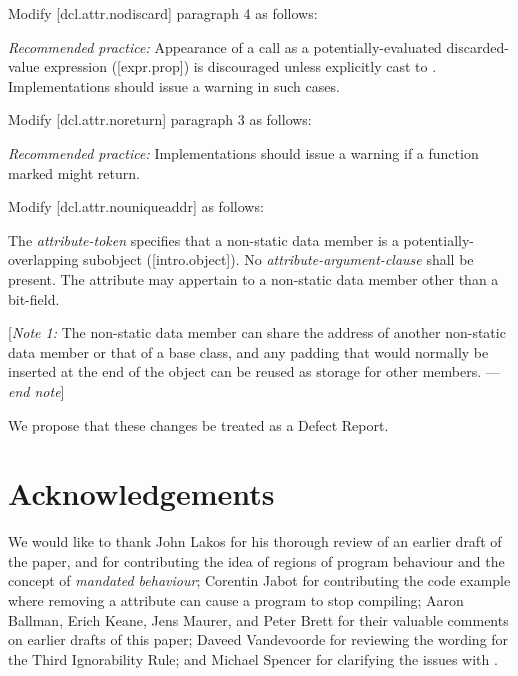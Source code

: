 Modify [dcl.attr.nodiscard] paragraph 4 as follows:

\begin{adjustwidth}{0.5cm}{0.5cm}
\emph{Recommended practice:} Appearance of a  call as a potentially-evaluated discarded-value expression ([expr.prop]) is discouraged unless explicitly cast to . Implementations should issue a warning in such cases. 
\end{adjustwidth}

Modify [dcl.attr.noreturn] paragraph 3 as follows:

\begin{adjustwidth}{0.5cm}{0.5cm}
\emph{Recommended practice:} Implementations should issue a warning if a function marked \tcode{[[noreturn]]} might return. 
\end{adjustwidth}

Modify [dcl.attr.nouniqueaddr] as follows:

\begin{adjustwidth}{0.5cm}{0.5cm}
The \emph{attribute-token}  specifies that a non-static data member is a potentially-overlapping subobject ([intro.object]). No \emph{attribute-argument-clause} shall be present. The attribute may appertain to a non-static data member other than a bit-field.

[\emph{Note 1:} The non-static data member can share the address of another non-static data member or that of a base class, and any padding that would normally be inserted at the end of the object can be reused as storage for other members. --- \emph{end note}]

\end{adjustwidth}

We propose that these changes be treated as a Defect Report.

\section*{Acknowledgements}
We would like to thank John Lakos for his thorough review of an earlier draft of the paper, and for contributing the idea of regions of program behaviour and the concept of \emph{mandated behaviour}; Corentin Jabot for contributing the code example where removing a \mbox{} attribute can cause a program to stop compiling; Aaron Ballman, Erich Keane, Jens Maurer, and Peter Brett for their valuable comments on earlier drafts of this paper; Daveed Vandevoorde for reviewing the wording for the Third Ignorability Rule; and Michael Spencer for clarifying the issues with .

\renewcommand{\bibname}{References}



